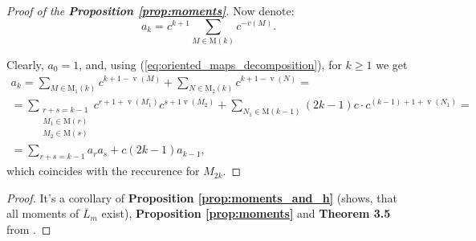 \documentclass{article}
\begin{document}
\begin{proof}[Proof of the \textbf{Proposition \ref{prop:moments}}]
    Now denote:
    $$
        a_k = c^{k + 1}\sum\limits_{M \in \mathrm{M}(k)}c^{-v(M)}.
    $$
    
    Clearly, $a_0 = 1$, and, using (\ref{eq:oriented_maps_decomposition}), for $k \geq 1$ we get
    \begin{multline}
		a_k = \sum\limits_{M \in \mathrm{M_1}(k)}c^{k + 1 - \mathop{v}(M)} + \sum\limits_{N \in \mathrm{M_2}(k)}c^{k + 1 - \mathop{v}(N)} = \\
		 = \sum\limits_{\substack{r + s = k - 1 \\ M_1 \in \mathrm{M}(r) \\ M_2 \in \mathrm{M}(s)}}c^{r + 1 + \mathop{v}(M_1)}c^{s + 1 \mathop{v}(M_2)} + \sum\limits_{N_1 \in \mathrm{M}(k - 1)}(2k - 1)c\cdot c^{(k - 1) + 1 + \mathop{v}(N_1)} = \\
		 = \sum\limits_{r + s = k - 1}a_ra_s + c(2k - 1)a_{k - 1},
    \end{multline}
    which coincides with the reccurence for $M_{2k}$.
\end{proof}

\begin{proof}
	It's a corollary of \textbf{Proposition \ref{prop:moments_and_h}} (shows, that all moments of $\overline{L}_m$ exist), \textbf{Proposition \ref{prop:moments}} and \textbf{Theorem 3.5} from \cite{randmatrgeneral}.
\end{proof}
\end{document}
